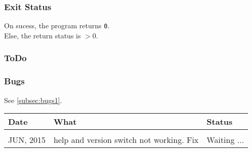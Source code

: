 \subsubsection{Exit Status}
On sucess, the program returns \texttt{0}.\\
Else, the return status is $>$0.

\subsubsection{ToDo}

\subsubsection{Bugs}
See \autoref{subsec:bugs1}.
\bigskip

\begin{tabular}{l l l}
Date & What & Status\\
\hline \\
JUN, 2015 & help and version switch not working. Fix & Waiting ...\\
\end{tabular}
